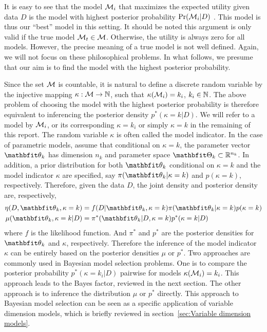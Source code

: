 It is easy to see that the model $\mathcal{M}_i$ that maximizes the expected utility
given data $D$ is the model with highest posterior probability
$\Pr(\mathcal{M}_i|D)$ \parencite[see][chap.~6]{Bernardo:2000vd}. This model is thus
our ``best'' model in this setting. It should be noted this argument is only
valid if the true model $\mathcal{M}_t \in \mathcal{M}$. Otherwise, the utility is always
zero for all models. However, the precise meaning of a true model is not well
defined. Again, we will not focus on these philosophical problems. In what
follows, we presume that our aim is to find the model with the highest
posterior probability.

Since the set $\mathcal{M}$ is countable, it is natural to define a discrete random
variable by the injective mapping $\kappa:\mathcal{M}\to\mathbb{N}$, such that
$\kappa(\mathcal{M}_i) = k_i$, $k_i \in \mathbb{N}$. The above problem of choosing the
model with the highest posterior probability is therefore equivalent to
inferencing the posterior density $p^*(\kappa = k|D)$. We will refer to a
model by $\mathcal{M}_i$, or its corresponding $\kappa = k_i$ or simply $\kappa = k$
in the remaining of this report. The random variable $\kappa$ is often called
the model indicator. In the case of parametric models, assume that conditional
on $\kappa = k$, the parameter vector $\bth_k$ has dimension $n_k$ and
parameter space $\bTh_k\subset\bbR^{n_k}$. In addition, a prior distribution
for both $\bth_k$ conditional on $\kappa = k$ and the model indicator $\kappa$
are specified, say $\pi(\bth_k|\kappa =k)$ and $p(\kappa = k)$, respectively.
Therefore, given the data $D$, the joint density and posterior density are,
respectively,
\begin{align}
  \eta(D,\bth_k,\kappa=k)
  &= f(D|\bth_k,\kappa=k)\pi(\bth_k|\kappa=k)p(\kappa=k)
  \label{eq:full joint}\\
  \mu(\bth_k,\kappa=k|D)
  &= \pi^*(\bth_k|D,\kappa=k)p^*(\kappa=k|D)
  \label{eq:full posterior}
\end{align}
where $f$ is the likelihood function. And $\pi^*$ and $p^*$ are the posterior
densities for $\bth_k$ and $\kappa$, respectively. Therefore the inference of
the model indicator $\kappa$ can be entirely based on the posterior densities
$\mu$ or $p^*$. Two approaches are commonly used in Bayesian model selection
problems. One is to compare the posterior probability $p^*(\kappa=k_i|D)$
pairwise for models $\kappa(\mathcal{M}_i) = k_i$. This approach leads to the Bayes
factor, reviewed in the next section. The other approach is to inference the
distribution $\mu$ or $p^*$ directly. This approach to Bayesian model
selection can be seen as a specific application of variable dimension models,
which is briefly reviewed in section~\ref{sec:Variable dimension models}.

